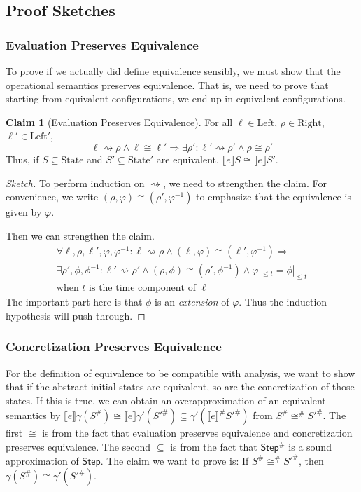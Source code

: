 \documentclass{article}
\theoremstyle{definition}
\newtheorem{clm}{Claim}[section]
\newcommand*{\Abs}[1]{{#1}^{\#}}
\newcommand*{\Left}{\text{Left}}
\newcommand*{\Right}{\text{Right}}
\newcommand*{\State}{\text{State}}
\newcommand*{\Step}{\mathsf{Step}}
\newcommand*{\semarrow}{\rightsquigarrow}
\newcommand*{\sembracket}[1]{\lBrack{#1}\rBrack}
\begin{document}
\subsection{Proof Sketches}
\subsubsection{Evaluation Preserves Equivalence}
To prove if we actually did define equivalence sensibly, we must show that the operational semantics preserves equivalence.
That is, we need to prove that starting from equivalent configurations, we end up in equivalent configurations.
\begin{clm}[Evaluation Preserves Equivalence]
  For all $\ell\in\Left$, $\rho\in\Right$, $\ell'\in\Left'$,
  \[\ell\semarrow\rho\wedge\ell\cong\ell'\Rightarrow\exists\rho':\ell'\semarrow\rho'\wedge\rho\cong\rho'\]
  Thus, if $S\subseteq\State$ and $S'\subseteq\State'$ are equivalent, $\sembracket{e}S\cong\sembracket{e}S'$.
\end{clm}
\begin{proof}[Sketch]
  To perform induction on $\semarrow$, we need to strengthen the claim.
  For convenience, we write $(\rho,\varphi)\cong(\rho',\varphi^{-1})$ to emphasize that the equivalence is given by $\varphi$.

  Then we can strengthen the claim.
  \[
    \begin{array}{l}
      \forall\ell,\rho,\ell',\varphi,\varphi^{-1}:\ell\semarrow\rho\wedge(\ell,\varphi)\cong(\ell',\varphi^{-1})\Rightarrow              \\
      \exists\rho',\phi,\phi^{-1}:\ell'\semarrow\rho'\wedge(\rho,\phi)\cong(\rho',\phi^{-1})\wedge\varphi|_{\le t}=\phi|_{\le t} \\
      \text{when }t\text{ is the time component of }\ell
    \end{array}
  \]
  The important part here is that $\phi$ is an \emph{extension} of $\varphi$.
  Thus the induction hypothesis will push through.
\end{proof}

\subsubsection{Concretization Preserves Equivalence}
For the definition of equivalence to be compatible with analysis, we want to show that if the abstract initial states are equivalent, so are the concretization of those states.
If this is true, we can obtain an overapproximation of an equivalent semantics by $\sembracket{e}\gamma(\Abs{S})\cong\sembracket{e}\gamma'(\Abs{S'})\subseteq\gamma'(\Abs{\sembracket{e}}\Abs{S'})$ from $\Abs{S}\Abs\cong\Abs{S'}$.
The first $\cong$ is from the fact that evaluation preserves equivalence and concretization preserves equivalence.
The second $\subseteq$ is from the fact that $\Abs\Step$ is a sound approximation of $\Step$.
The claim we want to prove is: If $\Abs{S}\Abs\cong\Abs{S'}$, then $\gamma(\Abs{S})\cong\gamma'(\Abs{S'})$.
\end{document}
